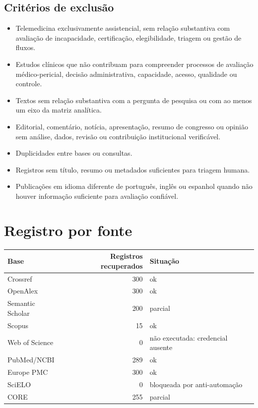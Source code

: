 \documentclass[12pt,a4paper]{article}
\begin{document}
\subsection{Critérios de exclusão}
\label{sec:org71b200c}
\begin{itemize}
\item Telemedicina exclusivamente assistencial, sem relação substantiva com avaliação de incapacidade, certificação, elegibilidade, triagem ou gestão de fluxos.
\item Estudos clínicos que não contribuam para compreender processos de avaliação médico-pericial, decisão administrativa, capacidade, acesso, qualidade ou controle.
\item Textos sem relação substantiva com a pergunta de pesquisa ou com ao menos um eixo da matriz analítica.
\item Editorial, comentário, notícia, apresentação, resumo de congresso ou opinião sem análise, dados, revisão ou contribuição institucional verificável.
\item Duplicidades entre bases ou consultas.
\item Registros sem título, resumo ou metadados suficientes para triagem humana.
\item Publicações em idioma diferente de português, inglês ou espanhol quando não houver informação suficiente para avaliação confiável.
\end{itemize}

\section{Registro por fonte}
\label{sec:org3c8b529}
\begin{center}
\begin{tabular}{lrl}
Base & Registros recuperados & Situação\\
\hline
Crossref & 300 & ok\\
OpenAlex & 300 & ok\\
Semantic Scholar & 200 & parcial\\
Scopus & 15 & ok\\
Web of Science & 0 & não executada: credencial ausente\\
PubMed/NCBI & 289 & ok\\
Europe PMC & 300 & ok\\
SciELO & 0 & bloqueada por anti-automação\\
CORE & 255 & parcial\\
\end{tabular}
\end{center}
\end{document}
